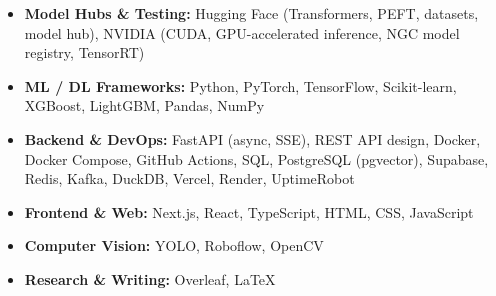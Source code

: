\documentclass[11pt,a4paper]{article}
\begin{document}
\begin{itemize}
\begin{itemize}
        \item \textit{RLHF \& Alignment:} Reinforcement Learning from Human Feedback (RLHF), reward model training, Proximal Policy Optimization (PPO), Direct Preference Optimization (DPO)
        \item \textit{Iterative Fine-Tuning:} Converting model outputs + human corrections into new
training data; continual/online learning loops; automated retraining triggers
        \item \textit{Self-Reflection \& Critique:} Chain-of-Thought self-correction, Constitutional AI (model
critiques and revises its own outputs), LLM-as-Judge automated evaluation
        \item \textit{Knowledge \& Memory Updates:} RAG knowledge base refresh from new interactions,
Graph RAG graph expansion, persistent long-term conversational memory
        \item \textit{Prompt Optimization:} Behaviour-based prompt adjustment, automated prompt engineering (DSPy-style), A/B testing of prompt variants
        \item \textit{Synthetic Data Generation:} LLM-generated training examples, self-play data creation, data augmentation for low-resource tasks
        \item \textit{Active Learning:} Model flags low-confidence outputs for human review; uncertainty
sampling to minimise labelling cost
    \end{itemize}
    \item \textbf{Model Hubs \& Testing:} Hugging Face (Transformers, PEFT, datasets, model hub),
NVIDIA (CUDA, GPU-accelerated inference, NGC model registry, TensorRT)
    \item \textbf{ML / DL Frameworks:} Python, PyTorch, TensorFlow, Scikit-learn, XGBoost, LightGBM,
Pandas, NumPy
    \item \textbf{Backend \& DevOps:} FastAPI (async, SSE), REST API design, Docker, Docker Compose, GitHub Actions, SQL,
PostgreSQL (pgvector), Supabase, Redis, Kafka, DuckDB, Vercel, Render, UptimeRobot
    \item \textbf{Frontend \& Web:} Next.js, React, TypeScript, HTML, CSS, JavaScript
    \item \textbf{Computer Vision:} YOLO, Roboflow, OpenCV
    \item \textbf{Research \& Writing:} Overleaf, \LaTeX
\end{itemize}

\end{document}
